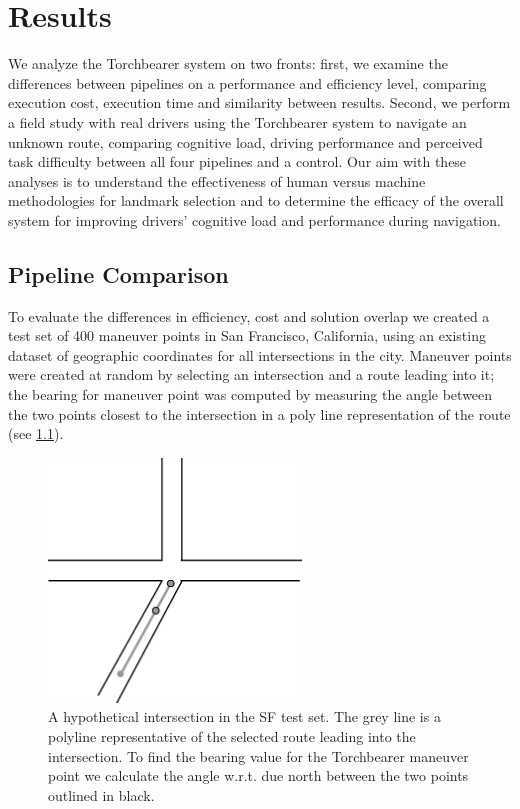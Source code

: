 \chapter{Results}\label{CH:results}

We analyze the Torchbearer system on two fronts: first, we examine the differences between pipelines on a performance and efficiency level, comparing execution cost, execution time and similarity between results. Second, we perform a field study with real drivers using the Torchbearer system to navigate an unknown route, comparing cognitive load, driving performance and perceived task difficulty between all four pipelines and a control. Our aim with these analyses is to understand the effectiveness of human versus machine methodologies for landmark selection and to determine the efficacy of the overall system for improving drivers' cognitive load and performance during navigation.

\section{Pipeline Comparison}

To evaluate the differences in efficiency, cost and solution overlap we created a test set of 400 maneuver points in San Francisco, California, using an existing dataset \cite{sfIntersections} of geographic coordinates for all intersections in the city. Maneuver points were created at random by selecting an intersection and a route leading into it; the bearing for maneuver point was computed by measuring the angle between the two points closest to the intersection in a poly line representation of the route (see \ref{fig:polyline}).

\begin{figure}[htbp]
  \centering
  \includegraphics[width=0.6\textwidth]{images/POLYLINE.pdf}
  \caption{A hypothetical intersection in the SF test set. The grey line is a polyline representative of the selected route leading into the intersection. To find the bearing value for the Torchbearer maneuver point we calculate the angle w.r.t. due north between the two points outlined in black.}
  \label{fig:polyline}
\end{figure}

